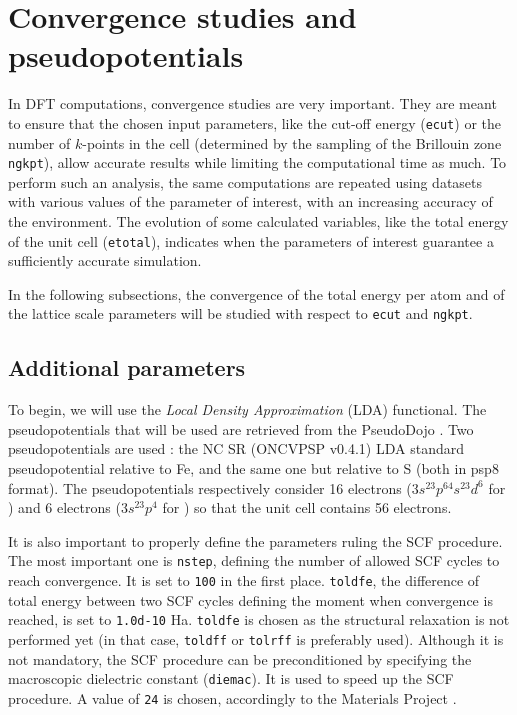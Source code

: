 \documentclass[11pt,a4paper]{article}
\begin{document}
\section{Convergence studies and pseudopotentials}
In DFT computations, convergence studies are very important. They are meant to ensure that the chosen input parameters, like the cut-off energy (\texttt{ecut}) or the number of $k$-points in the cell (determined by the sampling of the Brillouin zone \texttt{ngkpt}), allow accurate results while limiting the computational time as much. To perform such an analysis, the same computations are repeated using datasets with various values of the parameter of interest, with an increasing accuracy of the environment. The evolution of some calculated variables, like the total energy of the unit cell (\texttt{etotal}), indicates when the parameters of interest guarantee a sufficiently accurate simulation.

In the following subsections, the convergence of the total energy per atom and of the lattice scale parameters will be studied with respect to \texttt{ecut} and \texttt{ngkpt}.
\subsection{Additional parameters}
To begin, we will use the \textit{Local Density Approximation} (LDA) functional. The pseudopotentials that will be used are retrieved from the PseudoDojo \cite{PseudoDojo}. Two pseudopotentials are used : the NC SR (ONCVPSP v0.4.1) LDA standard pseudopotential relative to Fe, and the same one but relative to S (both in psp8 format). The pseudopotentials respectively consider 16 electrons ($3s^23p^64s^23d^6$ for ) and 6 electrons ($3s^23p^4$ for ) so that the unit cell contains 56 electrons.

It is also important to properly define the parameters ruling the SCF procedure. The most important one is \texttt{nstep}, defining the number of allowed SCF cycles to reach convergence. It is set to \texttt{100} in the first place. \texttt{toldfe}, the difference of total energy between two SCF cycles defining the moment when convergence is reached, is set to \texttt{1.0d-10} Ha. \texttt{toldfe} is chosen as the structural relaxation is not performed yet (in that case, \texttt{toldff} or \texttt{tolrff} is preferably used). Although it is not mandatory, the SCF procedure can be preconditioned by specifying the macroscopic dielectric constant (\texttt{diemac}). It is used to speed up the SCF procedure. A value of \texttt{24} is chosen, accordingly to the Materials Project \cite{MaterialsProject}. 
\end{document}

